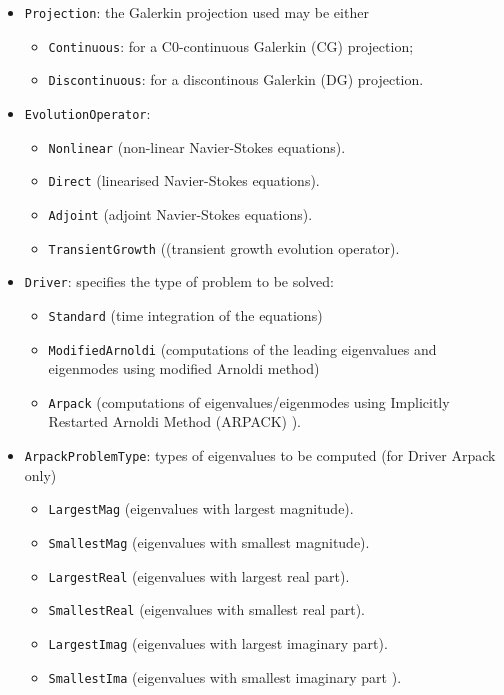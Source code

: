 \begin{itemize}
\item \texttt{Projection}: the Galerkin projection used may be either 
\begin{itemize}
\item \texttt{Continuous}: for a C0-continuous Galerkin (CG) projection;
\item \texttt{Discontinuous}: for a discontinous Galerkin (DG) projection. 
\end{itemize}

\item \texttt{EvolutionOperator}:
\begin{itemize}
\item \texttt{Nonlinear} (non-linear Navier-Stokes equations).
\item \texttt{Direct} (linearised Navier-Stokes equations).
\item \texttt{Adjoint} (adjoint Navier-Stokes equations).
\item \texttt{TransientGrowth} ((transient growth evolution operator).
\end{itemize}

\item \texttt{Driver}: specifies  the type of problem to be solved:
   \begin{itemize}
    \item \texttt{Standard} (time integration of the equations)
    \item \texttt{ModifiedArnoldi} (computations of the leading eigenvalues and eigenmodes using modified Arnoldi method)
    \item \texttt{Arpack} (computations of eigenvalues/eigenmodes using Implicitly Restarted Arnoldi Method (ARPACK) ).
    \end{itemize}
    
\item \texttt{ArpackProblemType}: types of eigenvalues to be computed (for Driver Arpack only) 
\begin{itemize}
\item \texttt{LargestMag} (eigenvalues with largest magnitude).
\item \texttt{SmallestMag} (eigenvalues with smallest magnitude). 
\item \texttt{LargestReal} (eigenvalues with largest real part).
\item \texttt{SmallestReal} (eigenvalues with smallest real part). 
\item \texttt{LargestImag} (eigenvalues with largest imaginary part). 
\item \texttt{SmallestIma} (eigenvalues with smallest imaginary part ). 
\end{itemize}    


\end{itemize}
